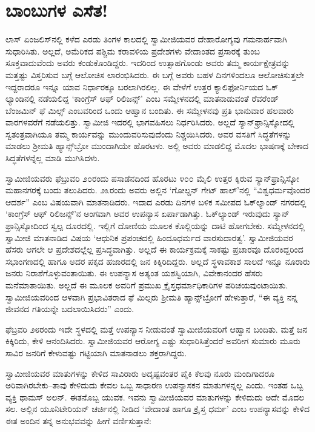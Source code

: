 
\chapter{ಬಾಂಬುಗಳ ಎಸೆತ!}

\noindent

ಲಾಸ್ ಏಂಜಲಿಸ್​ನಲ್ಲಿ ಕಳೆದ ಎರಡು ತಿಂಗಳ ಕಾಲದಲ್ಲಿ ಸ್ವಾಮೀಜಿಯವರ ದೇಹಾರೋಗ್ಯವು ಗಮನಾರ್ಹವಾಗಿ ಸುಧಾರಿಸಿತು. ಅಲ್ಲದೆ, ಅಮೆರಿಕದ ಪಶ್ಚಿಮ ಕರಾವಳಿಯ ಪ್ರದೇಶಗಳು ವೇದಾಂತದ ಪ್ರಸಾರಕ್ಕೆ ತುಂಬ ಸೂಕ್ತವಾದುವೆಂದು ಅವರು ಕಂಡುಕೊಂಡಿದ್ದರು. ಇದರಿಂದ ಉತ್ಸಾಹಗೊಂಡು ಅವರು ತಮ್ಮ ಕಾರ್ಯಕ್ಷೇತ್ರವನ್ನು ಮತ್ತಷ್ಟು ವಿಸ್ತರಿಸುವ ಬಗ್ಗೆ ಆಲೋಚಿಸ ಲಾರಂಭಿಸಿದರು. ಈ ಬಗ್ಗೆ ಅವರು ಬಹಳ ದಿನಗಳಿಂದಲೂ ಆಲೋಚಿಸುತ್ತಲೇ ಇದ್ದರಾದರೂ ಇನ್ನೂ ಯಾವ ನಿರ್ಧಾರಕ್ಕೂ ಬರಲಾಗಿರಲಿಲ್ಲ. ಈ ವೇಳೆಗೆ ಉತ್ತರ ಕ್ಯಾಲಿಫೋರ್ನಿಯದ ಓಕ್ ಲ್ಯಾಂಡಿನಲ್ಲಿ ನಡೆಯಲಿದ್ದ ‘ಕಾಂಗ್ರೆಸ್ ಆಫ್ ರಿಲಿಜನ್ಸ್​’ ಎಂಬ ಸಮ್ಮೇಳನದಲ್ಲಿ ಮಾತನಾಡುವಂತೆ ರೆವರೆಂಡ್ ಬೆಂಜಮಿನ್ ಫೆ ಮಿಲ್ಸ್ ಎಂಬವರಿಂದ ಒಂದು ಆಹ್ವಾನ ಬಂದಿತು. ಈ ಸಮ್ಮೇಳನವು ಪ್ರತಿ ಭಾನುವಾರ ಹಲವಾರು ವಾರಗಳವರೆಗೆ ನಡೆಯಲಿತ್ತು. ಸ್ವಾಮೀಜಿ ಇದರಲ್ಲಿ ಭಾಗವಹಿಸಲು ನಿರ್ಧರಿಸಿದರು. ಅಲ್ಲದೆ ಸ್ಯಾನ್​ಫ್ರಾನ್ಸಿಸ್ಕೋದಲ್ಲಿ ಸ್ವತಂತ್ರವಾಗಿಯೂ ತಮ್ಮ ಕಾರ್ಯವನ್ನು ಮುಂದುವರಿಸುವುದೆಂದು ನಿಶ್ಚಯಿಸಿದರು. ಅವರ ವಸತಿಗೆ ಸಿದ್ಧತೆಗಳನ್ನು ಮಾಡಲು ಶ್ರೀಮತಿ ಹ್ಯಾನ್ಸ್​ಬ್ರೋ ಮುಂದಾಗಿಯೇ ಹೊರಟಳು. ಅಲ್ಲಿ ಅವರು ಮಾಡಲಿದ್ದ ಮೊದಲ ಭಾಷಣಕ್ಕೆ ಬೇಕಾದ ಸಿದ್ಧತೆಗಳನ್ನೆಲ್ಲ ಮಾಡಿ ಮುಗಿಸಿದಳು.

ಸ್ವಾಮೀಜಿಯವರು ಫೆಬ್ರುವರಿ ೨೦ರಂದು ಪಸಾಡೆನದಿಂದ ಹೊರಟು ೪೦೦ ಮೈಲಿ ಉತ್ತರ ಕ್ಕಿರುವ ಸ್ಯಾನ್​ಫ್ರಾನ್ಸಿಸ್ಕೋ ಮಹಾನಗರಕ್ಕೆ ಬಂದು ತಲುಪಿದರು. ೨೩ರಂದು ಅವರು ಅಲ್ಲಿನ ‘ಗೋಲ್ಡನ್ ಗೇಟ್ ಹಾಲ್​’ನಲ್ಲಿ “ವಿಶ್ವಧರ್ಮವೊಂದರ ಆದರ್ಶ” ಎಂಬ ವಿಷಯವಾಗಿ ಮಾತನಾಡಿದರು. ಇದಾದ ಎರಡು ದಿನಗಳ ಬಳಿಕ ಸಮೀಪದ ಓಕ್​ಲ್ಯಾಂಡ್ ನಗರದಲ್ಲಿ ‘ಕಾಂಗ್ರೆಸ್ ಆಫ್ ರಿಲಿಜನ್ಸ್​’ನ ಅಂಗವಾಗಿ ಅವರ ಉಪನ್ಯಾಸ ಏರ್ಪಾಡಾಗಿತ್ತು. ಓಕ್​ಲ್ಯಾಂಡ್ ಇರುವುದು ಸ್ಯಾನ್​ಫ್ರಾನ್ಸಿಸ್ಕೋದಿಂದ ಸ್ವಲ್ಪ ದೂರದಲ್ಲಿ. ಇಲ್ಲಿಗೆ ದೋಣಿಯ ಮೂಲಕ ಕೊಲ್ಲಿಯನ್ನು ದಾಟಿ ಹೋಗಬೇಕು. ಸಮ್ಮೇಳನದಲ್ಲಿ ಸ್ವಾಮೀಜಿ ಮಾತನಾಡಿದ ವಿಷಯ ‘ಆಧುನಿಕ ಪ್ರಪಂಚದಲ್ಲಿ ಹಿಂದೂಧರ್ಮದ ವಾರಸುದಾರತ್ವ’. ಸ್ವಾಮೀಜಿಯವರ ಹೆಸರು ಆಗಲೇ ಆ ಪ್ರದೇಶದಲ್ಲೆಲ್ಲ ಪ್ರಸಿದ್ಧವಾಗಿತ್ತು. ಅಲ್ಲದೆ ಈ ಕಾರ್ಯಕ್ರಮಕ್ಕೆ ಸಾಕಷ್ಟು ಪ್ರಚಾರವೂ ದೊರಕಿದ್ದರಿಂದ ಸಭಾಂಗಣದಲ್ಲಿ ಹಾಗೂ ಅದರ ಪಕ್ಕದ ಹಜಾರದಲ್ಲಿ ಜನ ಕಿಕ್ಕಿರಿದಿದ್ದರು. ಅಲ್ಲದೆ ಸ್ಥಳಾವಕಾಶ ಸಾಲದೆ ಇನ್ನೂ ನೂರಾರು ಜನರು ನಿರಾಶೆಗೊಳ್ಳುವಂತಾಯಿತು. ಈ ಉಪನ್ಯಾಸ ಅತ್ಯಂತ ಯಶಸ್ವಿಯಾಗಿ, ವಿವೇಕಾನಂದರ ಹೆಸರು ಮನೆಮಾತಾಯಿತು. ಅಲ್ಲದೆ ಈ ಮೂಲಕ ಅವರಿಗೆ ಪ್ರಮುಖ ಕ್ರೈಸ್ತಧರ್ಮಾಧಿಕಾರಿಗಳ ಪರಿಚಯವುಂಟಾಯಿತು. ಸ್ವಾಮೀಜಿಯವರಿಂದ ಆಳವಾಗಿ ಪ್ರಭಾವಿತರಾದ ಫೆ ಮಿಲ್ಸರು ಶ್ರೀಮತಿ ಹ್ಯಾನ್ಸ್​ಬ್ರೋಗೆ ಹೇಳುತ್ತಾರೆ, “ಈ ವ್ಯಕ್ತಿ ನನ್ನ ಜೀವನದ ಗತಿಯನ್ನೇ ಬದಲಾಯಿಸಿದರು” ಎಂದು.

ಫೆಬ್ರವರಿ ೨೮ರಂದು ಇದೇ ಸ್ಥಳದಲ್ಲಿ ಮತ್ತೆ ಉಪನ್ಯಾಸ ನೀಡುವಂತೆ ಸ್ವಾಮೀಜಿಯವರಿಗೆ ಆಹ್ವಾನ ಬಂದಿತು. ಮತ್ತೆ ಜನ ಕಿಕ್ಕಿರಿದು, ಕೇಳಿ ಆನಂದಿಸಿದರು. ಸ್ವಾಮೀಜಿಯವರ ಆರೋಗ್ಯ ಎಷ್ಟು ಸುಧಾರಿಸಿತ್ತೆಂದರೆ ಅವರೀಗ ಸುಮಾರು ಮೂರು ಸಾವಿರ ಜನರಿಗೆ ಕೇಳುವಷ್ಟು ಗಟ್ಟಿಯಾಗಿ ಮಾತನಾಡಲು ಶಕ್ತರಾಗಿದ್ದರು.

ಸ್ವಾಮೀಜಿಯವರ ಮಾತುಗಳನ್ನು ಕೇಳಿದ ಸಾವಿರಾರು ಅದೃಷ್ಟವಂತರ ಪೈಕಿ ಕೆಲವು ನೂರು ಮಂದಿಗಾದರೂ ಅರಿವಾಗಿರಬೇಕು–ತಾವು ಕೇಳಿದುದು ಕೇವಲ ಒಬ್ಬ ಸಾಧಾರಣ ಉಪನ್ಯಾಸಕನ ಮಾತುಗಳನ್ನಲ್ಲ ಎಂದು. ಇಂತಹ ಒಬ್ಬ ವ್ಯಕ್ತಿ ಥಾಮಸ್ ಅಲನ್. ಈತನೊಬ್ಬ ಯುವಕ. ಇವನು ಸ್ವಾಮೀಜಿಯವರ ಮಾತುಗಳನ್ನು ಕೇಳಿದುದು ಅದೇ ಮೊದಲ ಸಲ. ಅಲ್ಲಿನ ಯೂನಿಟೇರಿಯನ್ ಚರ್ಚಿನಲ್ಲಿ ನೀಡಿದ ‘ವೇದಾಂತ ಹಾಗೂ ಕ್ರೈಸ್ತ ಧರ್ಮ’ ಎಂಬ ಉಪನ್ಯಾಸವನ್ನು ಕೇಳಿದ ಈತ ಅಂದಿನ ತನ್ನ ಅನುಭವವನ್ನು ಹೀಗೆ ವರ್ಣಿಸುತ್ತಾನೆ:

